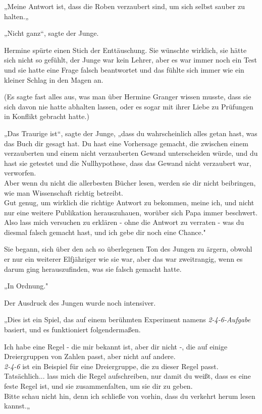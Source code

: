 {„Meine Antwort ist, dass die Roben verzaubert sind, um sich selbst sauber zu halten.„

„Nicht ganz“, sagte der Junge.

Hermine spürte einen Stich der Enttäuschung. Sie wünschte wirklich, sie hätte sich nicht so gefühlt, der Junge war kein Lehrer, aber es war immer noch ein Test und sie hatte eine Frage falsch beantwortet und das fühlte sich immer wie ein kleiner Schlag in den Magen an.

(Es sagte fast alles aus, was man über Hermine Granger wissen musste, dass sie sich davon nie hatte abhalten lassen, oder es sogar mit ihrer Liebe zu Prüfungen in Konflikt gebracht hatte.)

„Das Traurige ist“, sagte der Junge, „dass du wahrscheinlich alles getan hast, was das Buch dir gesagt hat. Du hast eine Vorhersage gemacht, die zwischen einem verzauberten und einem nicht verzauberten Gewand unterscheiden würde, und du hast sie getestet und die Nullhypothese, dass das Gewand nicht verzaubert war, verworfen.\\ Aber wenn du nicht die allerbesten Bücher lesen, werden sie dir nicht beibringen, wie man Wissenschaft richtig betreibt.\\ Gut genug, um wirklich die richtige Antwort zu bekommen, meine ich, und nicht nur eine weitere Publikation herauszuhauen, worüber sich Papa immer beschwert.\\ Also lass mich versuchen zu erklären - ohne die Antwort zu verraten - was du diesmal falsch gemacht hast, und ich gebe dir noch eine Chance."

Sie begann, sich über den ach so überlegenen Ton des Jungen zu ärgern, obwohl er nur ein weiterer Elfjähriger wie sie war, aber das war zweitrangig, wenn es darum ging herauszufinden, was sie falsch gemacht hatte.

„In Ordnung."

Der Ausdruck des Jungen wurde noch intensiver.

„Dies ist ein Spiel, das auf einem berühmten Experiment namens \emph{2-4-6-Aufgabe} basiert, und es funktioniert folgendermaßen.

Ich habe eine Regel - die mir bekannt ist, aber dir nicht -, die auf einige Dreiergruppen von Zahlen passt, aber nicht auf andere.\\ \emph{2-4-6} ist ein Beispiel für eine Dreiergruppe, die zu dieser Regel passt. Tatsächlich... lass mich die Regel aufschreiben, nur damit du weißt, dass es eine feste Regel ist, und sie zusammenfalten, um sie dir zu geben.\\ Bitte schau nicht hin, denn ich schließe von vorhin, dass du verkehrt herum lesen kannst.„

}
